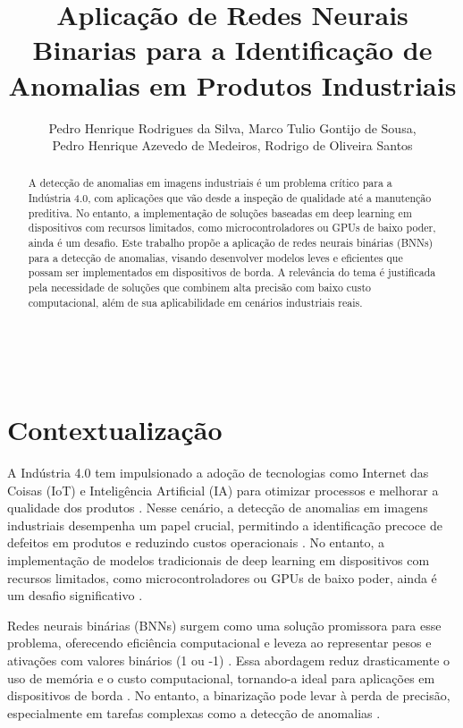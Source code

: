 \documentclass[12pt]{article}
\title{Aplicação de Redes Neurais Binarias para a Identificação de Anomalias em Produtos Industriais}
\author{Pedro Henrique Rodrigues da Silva, Marco Tulio Gontijo de Sousa, \\Pedro Henrique Azevedo de Medeiros, Rodrigo de Oliveira Santos }
\begin{document}
 

\maketitle


\
\begin{abstract}
  A detecção de anomalias em imagens industriais é um problema crítico para a Indústria 4.0, com aplicações que vão desde a inspeção de qualidade até a manutenção preditiva. No entanto, a implementação de soluções baseadas em deep learning em dispositivos com recursos limitados, como microcontroladores ou GPUs de baixo poder, ainda é um desafio. Este trabalho propõe a aplicação de redes neurais binárias (BNNs) para a detecção de anomalias, visando desenvolver modelos leves e eficientes que possam ser implementados em dispositivos de borda. A relevância do tema é justificada pela necessidade de soluções que combinem alta precisão com baixo custo computacional, além de sua aplicabilidade em cenários industriais reais.
\end{abstract}
\vspace{2cm}

\section{Contextualização}
A Indústria 4.0 tem impulsionado a adoção de tecnologias como Internet das Coisas (IoT) e Inteligência Artificial (IA) para otimizar processos e melhorar a qualidade dos produtos \cite{wang2018industrial}. Nesse cenário, a detecção de anomalias em imagens industriais desempenha um papel crucial, permitindo a identificação precoce de defeitos em produtos e reduzindo custos operacionais \cite{bergmann2019mvtec}. No entanto, a implementação de modelos tradicionais de deep learning em dispositivos com recursos limitados, como microcontroladores ou GPUs de baixo poder, ainda é um desafio significativo \cite{liu2020bidet}.

Redes neurais binárias (BNNs) surgem como uma solução promissora para esse problema, oferecendo eficiência computacional e leveza ao representar pesos e ativações com valores binários (1 ou -1) \cite{courbariaux2015binaryconnect}. Essa abordagem reduz drasticamente o uso de memória e o custo computacional, tornando-a ideal para aplicações em dispositivos de borda \cite{rastegari2016xnet}. No entanto, a binarização pode levar à perda de precisão, especialmente em tarefas complexas como a detecção de anomalias \cite{bulat2020binary}.
\end{document}
